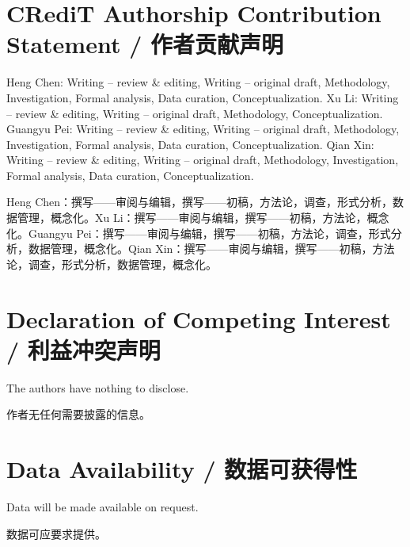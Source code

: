 \documentclass[12pt,a4paper]{article}
\newenvironment{original}
  {\par\medskip\noindent\ignorespaces}
  {\par\medskip}
\newenvironment{translation}
  {\par\noindent{\color{transblue}\ignorespaces}}
  {\par\bigskip}
\begin{document}
\section*{CRediT Authorship Contribution Statement / 作者贡献声明}
\begin{original}
Heng Chen: Writing -- review \& editing, Writing -- original draft, Methodology, Investigation, Formal analysis, Data curation, Conceptualization. Xu Li: Writing -- review \& editing, Writing -- original draft, Methodology, Conceptualization. Guangyu Pei: Writing -- review \& editing, Writing -- original draft, Methodology, Investigation, Formal analysis, Data curation, Conceptualization. Qian Xin: Writing -- review \& editing, Writing -- original draft, Methodology, Investigation, Formal analysis, Data curation, Conceptualization.
\end{original}
\begin{translation}
Heng Chen：撰写——审阅与编辑，撰写——初稿，方法论，调查，形式分析，数据管理，概念化。Xu Li：撰写——审阅与编辑，撰写——初稿，方法论，概念化。Guangyu Pei：撰写——审阅与编辑，撰写——初稿，方法论，调查，形式分析，数据管理，概念化。Qian Xin：撰写——审阅与编辑，撰写——初稿，方法论，调查，形式分析，数据管理，概念化。
\end{translation}

\section*{Declaration of Competing Interest / 利益冲突声明}
\begin{original}
The authors have nothing to disclose.
\end{original}
\begin{translation}
作者无任何需要披露的信息。
\end{translation}

\section*{Data Availability / 数据可获得性}
\begin{original}
Data will be made available on request.
\end{original}
\begin{translation}
数据可应要求提供。
\end{translation}

\appendix
\end{document}
